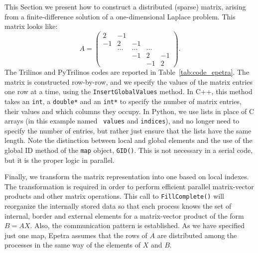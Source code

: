 \documentclass[acmtocl]{acmtrans2m}
\begin{document}
This Section we present how to construct a
distributed (sparse) matrix, arising from a finite-difference solution
of a one-dimensional Laplace problem. This matrix looks like:
\begin{equation*}
  A = \begin{pmatrix}
     2 & -1     &        &        &    \\
    -1 &  2     & -1     &        &    \\
       & \ldots & \ldots & \ldots &    \\
       &        & -1     & 2      & -1 \\
       &        &        & -1     & 2
\end{pmatrix}.
\end{equation*}
The Trilinos and PyTrilinos codes are reported in Table~\ref{tab:code_epetra}.
The matrix is constructed row-by-row, and
we specify the values of the matrix entries one row at a time,
using the {\tt InsertGlobalValues} method.  In C++, this method takes
an {\tt int}, a {\tt double*} and an {\tt int*} to specify the number
of matrix entries, their values and which columns they occupy.  In
Python, we use lists in place of C arrays (in this example named {\tt
  values} and {\tt indices}), and no longer need to specify the number
of entries, but rather just ensure that the lists have the same
length.
Note the distinction between local and global elements and the use of
the global ID method of the {\tt map} object, {\tt GID()}.  This is
not necessary in a serial code, but it is the proper logic in
parallel.

Finally, we transform the matrix representation into one based on
local indexes. The transformation is required in order to perform
efficient parallel matrix-vector products and other matrix
operations. This call to {\tt FillComplete()} will reorganize the
internally stored data so that each process knows the set of
internal, border and external elements for a matrix-vector product
of the form $B = AX$. Also, the communication pattern is
established. As we have specified just one map, Epetra assumes that
the rows of $A$ are distributed among the processes in the same way
of the elements of $X$ and $B$.
\end{document}
